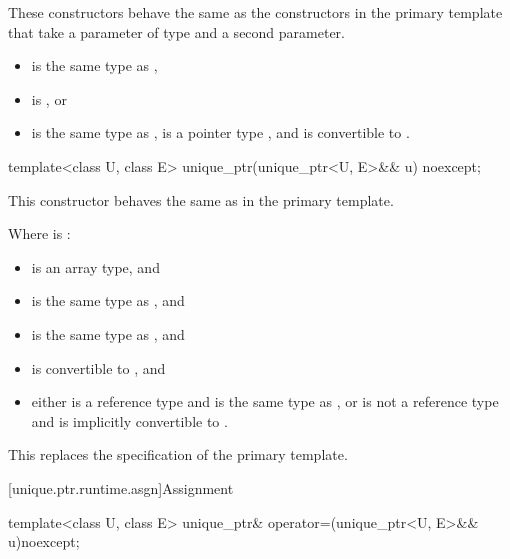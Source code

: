 \begin{itemdescr}
\pnum
These constructors behave the same as
the constructors in the primary template that
take a parameter of type  and a second parameter.

\pnum
\constraints
\begin{itemize}
\item {} is the same type as ,
\item {} is , or
\item {} is the same type as ,
       is a pointer type , and
       is convertible to .
\end{itemize}
\end{itemdescr}

%
\begin{itemdecl}
template<class U, class E> unique_ptr(unique_ptr<U, E>&& u) noexcept;
\end{itemdecl}

\begin{itemdescr}
\pnum
This constructor behaves the same as in the primary template.

\pnum
\constraints
Where  is :
\begin{itemize}
\item {} is an array type, and
\item {} is the same type as , and
\item {} is the same type as , and
\item {} is convertible to , and
\item either  is a reference type and  is the same type as ,
      or  is not a reference type and  is implicitly convertible to .
\end{itemize}

\begin{note}
This replaces the \constraints specification of the primary template.
\end{note}
\end{itemdescr}

[unique.ptr.runtime.asgn]{Assignment}

%
\begin{itemdecl}
template<class U, class E> unique_ptr& operator=(unique_ptr<U, E>&& u)noexcept;
\end{itemdecl}

